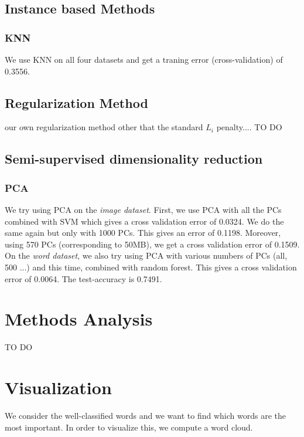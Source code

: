 \documentclass[11pt,twocolumn]{report}
\begin{document}
    \subsection*{Instance based Methods}
    \subsubsection{KNN}
    
    We use KNN on all four datasets and get a traning error (cross-validation) of 0.3556.
   
    \subsection*{Regularization Method}
    our own regularization method other that the standard $L_i$ penalty....
    TO DO
    \subsection*{Semi-supervised dimensionality reduction}
    \subsubsection*{PCA}
    We try using PCA on the \textit{image dataset}. First, we use PCA with all the PCs combined with SVM which gives a cross validation error of 0.0324. We do the same again but only with 1000 PCs. This gives an error of 0.1198. Moreover, using 570 PCs (corresponding to 50MB), we get a cross validation error of 0.1509.\\
    
    
   On the \textit{word dataset}, we also try using PCA with various numbers of PCs (all, 500 ...) and this time, combined with random forest. This gives a cross validation error of 0.0064. The test-accuracy is 0.7491.\\
    
    

\section *{Methods Analysis}
TO DO
\section*{Visualization}
    We consider the well-classified words and we want to find which words are the most important. In order to visualize this, we compute a word cloud. 
    
\end{document}

